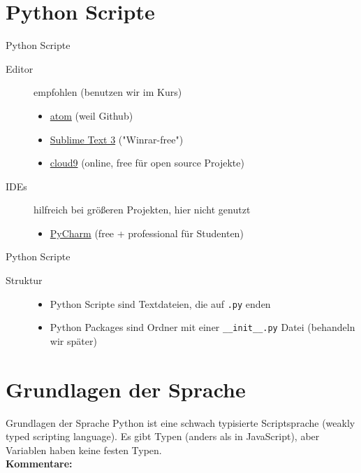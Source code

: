\section{Python Scripte}
\begin{frame}{Python Scripte}
\begin{description}
   	\item[Editor] empfohlen (benutzen wir im Kurs)
    \begin{itemize}
        \item \href{https://atom.io}{atom} (weil Github)
        \item \href{http://www.sublimetext.com/3}{Sublime Text 3} ("Winrar-free")
        \item \href{https://c9.i}{cloud9} (online, free für open source Projekte)
    \end{itemize}
    \item[IDEs] hilfreich bei grö\ss{}eren Projekten, hier nicht genutzt 
    \begin{itemize}
       	\item \href{https://jetbrains.com/pycharm}{PyCharm} (free + professional für Studenten)
   	\end{itemize}
\end{description}
\end{frame}
\begin{frame}{Python Scripte}
\begin{description}
   	\item[Struktur]
   	\begin{itemize}
       	\item Python Scripte sind Textdateien, die auf \texttt{.py} enden
        \item Python Packages sind Ordner mit einer \texttt{\_\_init\_\_.py} Datei (behandeln wir später)
    \end{itemize}
\end{description}
\end{frame}


\section{Grundlagen der Sprache}
\begin{frame}[fragile]{Grundlagen der Sprache}
    Python ist eine schwach typisierte Scriptsprache (weakly typed scripting language). Es gibt Typen (anders als in JavaScript), aber Variablen haben keine festen Typen.\\

    \textbf{Kommentare:}
    
\end{frame}


